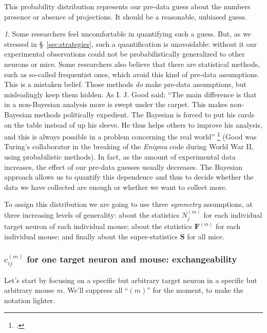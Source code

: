 \documentclass[\ifafour a4paper,12pt,\else a5paper,10pt,\fi%
onecolumn,oneside,article,%
british%
]{memoir}
\theoremstyle{remark}
\theoremstyle{innote}
\newtheorem*{innote}{}
\newcommand*{\citep}{\footcites}
\renewcommand*{\|}[1][]{\nonscript\,#1\vert\nonscript\;\mathopen{}}
\newcommand*{\sect}{\S}%
\newcommand*{\yF}{\bm{F}}
\newcommand*{\yFm}[1][m]{\yF^{(#1)}}
\newcommand*{\yNm}[1][m]{N^{(#1)}}
\newcommand*{\ycm}[1][m]{c^{(#1)}}
\newcommand*{\ySS}{S}
\newcommand*{\yS}{\bm{\ySS}}
\begin{document}
This probability distribution represents our pre-data guess about the
numbers presence or absence of projections. It should be a reasonable,
unbiased guess.
\begin{innote}
  Some researchers feel uncomfortable in quantifying such a guess. But, as
  we stressed in \sect~\ref{sec:strategies}, such a quantification is
  unavoidable: without it our experimental observations could not be
  probabilistically generalized to other neurons or mice. Some researchers
  also believe that there are statistical methods, such as so-called
  frequentist ones, which avoid this kind of pre-data assumptions. This is
  a mistaken belief. Those methods \emph{do} make pre-data assumptions, but
  misleadingly keep them hidden. %
  As I. J. Good said: \enquote{The main difference is that in a
    non-Bayesian analysis more is swept under the carpet. This makes
    non-Bayesian methods politically expedient. The Bayesian is forced to
    put his cards on the table instead of up his sleeve. He thus helps
    others to improve his analysis, and this is always possible in a
    problem concerning the real world} \citep[\sect~2.3 p.~26]{good1969}
  (Good was Turing's collaborator in the breaking of the \emph{Enigma} code
  during World War II, using probabilistic methods). In fact, as the amount
  of experimental data increases, the effect of our pre-data guesses
  usually decreases. The Bayesian approach allows us to quantify this
  dependence and thus to decide whether the data we have collected are
  enough or whether we want to collect more.
\end{innote}


To assign this distribution we are going to use three \emph{symmetry}
assumptions, at three increasing levels of generality: about the statistics
$\yNm_{j}$ for each individual target neuron of each individual mouse;
about the statistics $\yFm$ for each individual mouse; and finally about
the super-statistics $\yS$ for all mice.


\subsubsection{$\ycm_{ij}$ for one target neuron and mouse:
  exchangeability}
\label{sec:oneneuron_exch}

Let's start by focusing on a specific but arbitrary target neuron in a
specific but arbitrary mouse $m$. We'll suppress all \enquote{$(m)$} for
the moment, to make the notation lighter.
\end{document}
